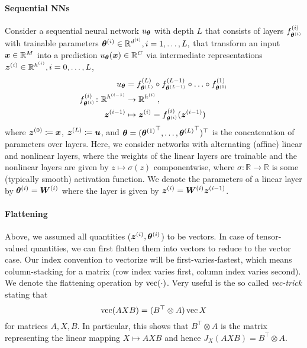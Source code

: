 \paragraph{Sequential NNs} Consider a sequential neural network $u_{{\bm{\theta}}}$ with depth $L$ that consists of layers $f^{(i)}_{{\bm{\theta}}^{(i)}}$ with trainable parameters ${\bm{\theta}}^{(i)} \in {\mathbb{R}}^{d^{(i)}}, i=1,\dots, L,$ that transform an input ${\bm{x}} \in {\mathbb{R}}^M$ into a prediction $u_{{\bm{\theta}}}({\bm{x}})\in {\mathbb{R}}^C$ via intermediate representations ${\bm{z}}^{(i)} \in {\mathbb{R}}^{h^{(i)}}, i= 0, \dots, L$,
\begin{align}
  \begin{split}
    u_{{\bm{\theta}}}
    &=
      f^{(L)}_{{\bm{\theta}}^{(L)}} \circ f^{(L-1)}_{{\bm{\theta}}^{(L-1)}} \circ \ldots \circ f^{(1)}_{{\bm{\theta}}^{(1)}}
    \\
    f^{(i)}_{{\bm{\theta}}^{(i)}}\colon {\mathbb{R}}^{h^{(i-1)}}
    &\to
      {\mathbb{R}}^{h^{(i)}}\,,
    \\
    {\bm{z}}^{(i-1)}
    &\mapsto
      {\bm{z}}^{(i)} = f^{(i)}_{{\bm{\theta}}^{(i)}}({\bm{z}}^{(i-1)})
  \end{split}
\end{align}
where ${\bm{z}}^{(0)} \coloneqq {\bm{x}}$, ${\bm{z}}^{(L)} \coloneqq {\bm{u}}$, and ${\bm{\theta}} = ({{\bm{\theta}}^{(1)}}^{\top}, \dots, {{\bm{\theta}}^{(L)}}^{\top})^{\top}$ is the concatenation of parameters over layers.
Here, we consider networks with alternating (affine) linear and nonlinear layers, where the weights of the linear layers are trainable and the nonlinear layers are given by $z\mapsto \sigma(z)$ componentwise, where $\sigma\colon\mathbb R\to\mathbb R$ is some (typically smooth) activation function. 
We denote the parameters of a linear layer by ${\bm{\theta}}^{(i)} = {\bm{W}}^{(i)}$ where the layer is given by ${\bm{z}}^{(i)} = {\bm{W}}^{(i)} {\bm{z}}^{(i-1)}$. 

\paragraph{Flattening} Above, we assumed all quantities (${\bm{z}}^{(i)}, {\bm{\theta}}^{(i)}$) to be vectors.
In case of tensor-valued quantities, we can first flatten them into vectors to reduce to the vector case.
Our index convention to vectorize will be first-varies-fastest, which means column-stacking for a matrix (row index varies first, column index varies second).
We denote the flattening operation by $\operatorname{vec}(\cdot)$.
Very useful is the so called \emph{vec-trick} stating that
\begin{equation}\label{eq:vecTrick}
  \operatorname{vec}(AXB) = (B^\top\otimes A)\operatorname{vec}{X}
\end{equation}
for matrices $A, X, B$. In particular, this shows that $B^\top\otimes A$ is the  matrix representing the linear mapping $X\mapsto AXB$ and hence $J_X(AXB) = B^\top\otimes A$.

